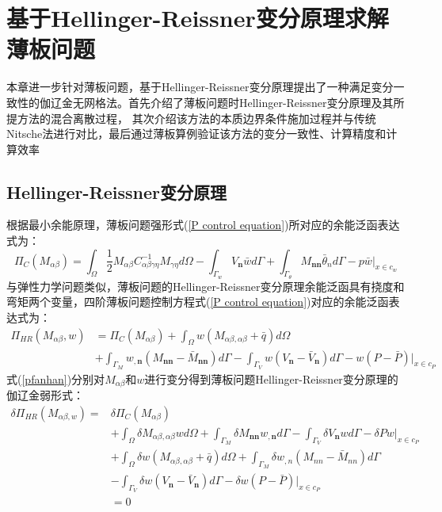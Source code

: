 \chapter{基于Hellinger-Reissner变分原理求解薄板问题}
本章进一步针对薄板问题，基于Hellinger-Reissner变分原理提出了一种满足变分一致性的伽辽金无网格法。首先介绍了薄板问题时Hellinger-Reissner变分原理及其所提方法的混合离散过程，
其次介绍该方法的本质边界条件施加过程并与传统Nitsche法进行对比，最后通过薄板算例验证该方法的变分一致性、计算精度和计算效率
\section{Hellinger-Reissner变分原理}
根据最小余能原理，薄板问题强形式(\ref{P control equation})所对应的余能泛函表达式为：
\begin{equation}
\Pi_C(M_{\alpha\beta})=\int_{\Omega}\frac{1}{2}M_{\alpha\beta}C^{-1}_{\alpha\beta\gamma\eta}M_{\gamma\eta}d\Omega-\int_{\Gamma_w}V_{\pmb n}\bar{w}d\Gamma+\int_{\Gamma_{\theta}}M_{\pmb{nn}}\bar{\theta}_nd\Gamma-p\bar{w}\vert_{x\in{c_w}}
\end{equation}
与弹性力学问题类似，薄板问题的Hellinger-Reissner变分原理余能泛函具有挠度和弯矩两个变量，四阶薄板问题控制方程式(\ref{P control equation})对应的余能泛函表达式为：
\begin{equation}\label{pfanhan}
\begin{split}
    \Pi_{H\!R}(M_{\alpha\beta},w)&=\Pi_C(M_{\alpha\beta})+\int_{\Omega}w(M_{\alpha\beta,\alpha\beta}+\bar{q})d\Omega\\
    &+\int_{\Gamma_M}w_{,\pmb n}(M_{\pmb{nn}}-\bar{M}_{\pmb{nn}})d\Gamma
    -\int_{\Gamma_V}w(V_{\pmb n}-\bar{V}_{\pmb n})d\Gamma-w(P-\bar{P})\vert_{x\in{c_P}}
\end{split}
\end{equation}
式(\ref{pfanhan})分别对$M_{\alpha\beta}$和$w$进行变分得到薄板问题Hellinger-Reissner变分原理的伽辽金弱形式：
\begin{equation}\label{Pweakfrom}
\begin{split}
    \delta\Pi_{H\!R}(M_{\alpha\beta,w})=&\delta\Pi_C(M_{\alpha\beta})\\
    &+\int_{\Omega}\delta M_{\alpha\beta,\alpha\beta}wd\Omega+\int_{\Gamma_M}\delta M_{\pmb{nn}}w_{,\pmb n}d\Gamma-\int_{\Gamma_V}\delta V_{\pmb n}wd\Gamma-\delta Pw\vert_{x\in{c_P}}\\
    &+\int_{\Omega}\delta w(M_{\alpha\beta,\alpha\beta}+\bar{q})d\Omega+\int_{\Gamma_M}\delta w_{,n}(M_{nn}-\bar{M}_{nn})d\Gamma\\
    &-\int_{\Gamma_V}\delta w(V_{\pmb n}-\bar{V}_{\pmb n})d\Gamma-\delta w(P-\bar{P})\vert_{x\in{c_P}}\\
    &=0
\end{split}
\end{equation}\par
